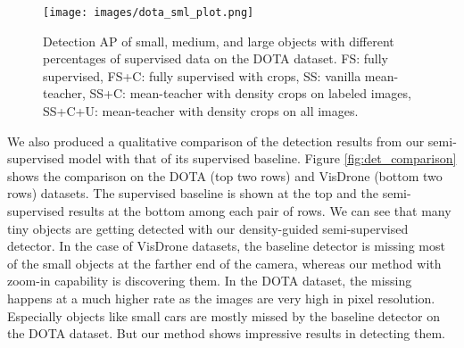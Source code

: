 \begin{figure}[t]
  \centering
  \texttt{[image: images/dota\_sml\_plot.png]} 
  \caption{Detection AP of small, medium, and large objects with different percentages of supervised data on the DOTA dataset. FS: fully supervised, FS+C: fully supervised with crops, SS: vanilla mean-teacher, SS+C: mean-teacher with density crops on labeled images, SS+C+U: mean-teacher with density crops on all images.}
  \label{fig:dota_sml}
\end{figure}


\begin{table*}
    \centering
    \caption{Performance comparison of our density crop guided semi-supervised object detection with 1\%, 5\%, and 10\% labeled images on the DOTA dataset. SSOD - semi-supervised detection with mean-teacher, Crop(L) - density crops on the labeled images, Crop (L + U) - density crops on the labeled and unlabeled images.}    
    \label{table:diff_sup_data_dota}
\end{table*}

We also produced a qualitative comparison of the detection results from our semi-supervised model with that of its supervised baseline. Figure \ref{fig:det_comparison} shows the comparison on the DOTA (top two rows) and VisDrone (bottom two rows) datasets. The supervised baseline is shown at the top and the semi-supervised results at the bottom among each pair of rows. We can see that many tiny objects are getting detected with our density-guided semi-supervised detector. In the case of VisDrone datasets, the baseline detector is missing most of the small objects at the farther end of the camera, whereas our method with zoom-in capability is discovering them. In the DOTA dataset, the missing happens at a much higher rate as the images are very high in pixel resolution. Especially objects like small cars are mostly missed by the baseline detector on the DOTA dataset. But our method shows impressive results in detecting them.

